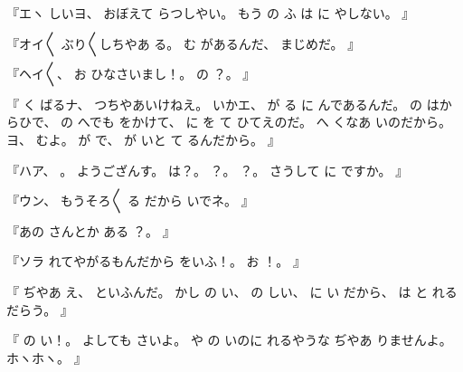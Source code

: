 %
『エヽ
しいヨ、
%
おぼえて
らつしやい。
%
もう
の
ふ
は
に
やしない。
』

%
『オイ〳〵
ぶり〳〵しちやあ
る。
%
む
があるんだ、
%
まじめだ。
』

%
『ヘイ〳〵、
%
お
ひなさいまし！。
%
の
？。
』

%
『
く
ばるナ、
%
つちやあいけねえ。
%
いかエ、
%
が
る
に
んであるんだ。
%
の
はからひで、
%
の
へでも
をかけて、
%
に
を
て
ひてえのだ。
%
へ
くなあ
いのだから。
%
ヨ、
%
むよ。
%
が
で、
%
が
いと
て
るんだから。
』

%
『ハア、
%
。
%
ようござんす。
%
は？。
%
？。
%
？。
%
さうして
に
ですか。%
』

%
『ウン、
%
もうそろ〳〵
る
だから
いでネ。
』

%
『あの
さんとか
ある
？。
』

%
『ソラ
れてやがるもんだから
をいふ！。
%
お
！。
』

%
『
ぢやあ
え、
%
といふんだ。
%
かし
の
い、
%
の
しい、
%
に
い
だから、
%
は
と
れるだらう。
』

%
『
の
い！。
%
よしても
さいよ。
%
や
の
いのに
れるやうな
ぢやあ
りませんよ。
%
ホヽホヽ。
』

